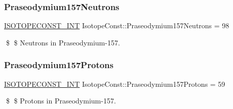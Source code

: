 \subsubsection{\texorpdfstring{Praseodymium157\+Neutrons}{Praseodymium157Neutrons}}
{\footnotesize\ttfamily \mbox{\hyperlink{group___isotope_const-_macros_ga5f18360b3e99483a35c32d789e62621c}{I\+S\+O\+T\+O\+P\+E\+C\+O\+N\+S\+T\+\_\+\+I\+NT}} Isotope\+Const\+::\+Praseodymium157\+Neutrons = 98}

\$ \$ Neutrons in Praseodymium-\/157. \mbox{\label{group___isotope_const-_praseodymium-_pr157_gad174a9f2c85dab162deaf3e8c0cbc8b6}} 
\subsubsection{\texorpdfstring{Praseodymium157\+Protons}{Praseodymium157Protons}}
{\footnotesize\ttfamily \mbox{\hyperlink{group___isotope_const-_macros_ga5f18360b3e99483a35c32d789e62621c}{I\+S\+O\+T\+O\+P\+E\+C\+O\+N\+S\+T\+\_\+\+I\+NT}} Isotope\+Const\+::\+Praseodymium157\+Protons = 59}

\$ \$ Protons in Praseodymium-\/157. 